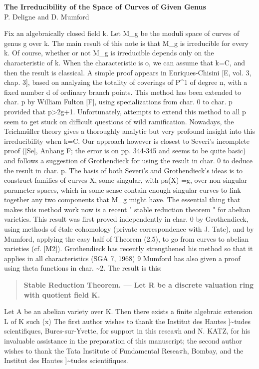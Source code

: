 \documentclass[11pt]{article}
\theoremstyle{plain}
\theoremstyle{definition}
\theoremstyle{remark}
\begin{document}
\begin{center}
{\Large\bfseries The Irreducibility of the Space of Curves of Given Genus}\\[0.7em]
{\large P. Deligne and D. Mumford}
\end{center}
Fix an algebraically closed field k. Let M\_g be the moduli space of curves of genus g over k. The main result of this note is that M\_g is irreducible for every k. Of course, whether or not M\_g is irreducible depends only on the characteristic of k. When the characteristic is o, we can assume that k=C, and then the result is classical. A simple proof appears in Enriques-Chisini [E, vol. 3, chap. 3], based on analyzing the totality of coverings of P\textasciicircum{}1 of degree n, with a fixed number d of ordinary branch points. This method has been extended to char. p by William Fulton [F], using specializations from char. 0 to char. p provided that p>2g+1. Unfortunately, attempts to extend this method to all p seem to get stuck on difficult questions of wild ramification. Nowadays, the Teichm\"uller theory gives a thoroughly analytic but very profound insight into this irreducibility when k=C. Our approach however is closest to Severi's incomplete proof ([Se], Anhang F; the error is on pp. 344-345 and seems to be quite basic) and follows a suggestion of Grothendieck for using the result in char. 0 to deduce the result in char. p. The basis of both Severi's and Grothendieck's ideas is to construct families of curves X, some singular, with pa(X)-=g, over non-singular parameter spaces, which in some sense contain enough singular curves to link together any two components that M\_g might have. The essential thing that makes this method work now is a recent " stable reduction theorem " for abelian varieties. This result was first proved independently in char. 0 by Grothendieck, using methods of \'etale cohomology (private correspondence with J. Tate), and by Mumford, applying the easy half of Theorem (2.5), to go from curves to abelian varieties (cf. [M2]). Grothendieck has recently strengthened his method so that it applies in all characteristics (SGA 7, 1968) 9 Mumford has also given a proof using theta functions in char. \textasciitilde{}2. The result is this:

\begin{quote}\textbf{Stable Reduction Theorem. --- Let R be a discrete valuation ring with quotient field K.}\end{quote}
Let A be an abelian variety over K. Then there exists a finite algebraic extension L of K such (x) The first author wishes to thank the Institut des Hautes ]\textasciitilde{}tudes scientifiques, Bures-sur-Yvette, for support in this resea$\pi$h and N. KATZ, for his invaluable assistance in the preparation of this manuscript; the second author wishes to thank the Tata Institute of Fundamental Resea$\pi$h, Bombay, and the Institut des Hautes ]\textasciitilde{}tudes scientifiques.
\end{document}
